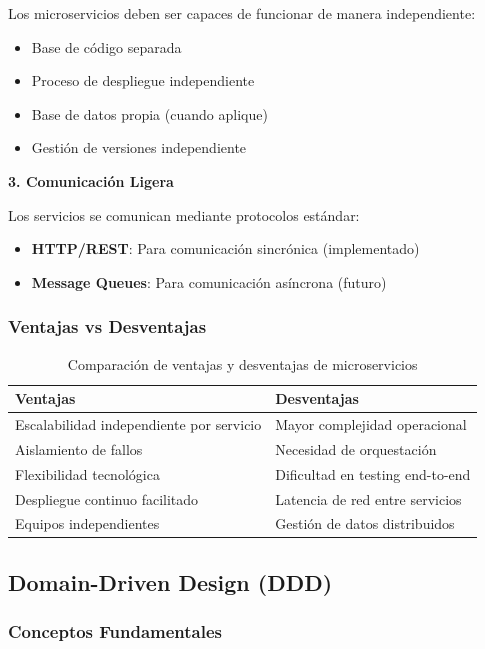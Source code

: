 \documentclass[12pt,a4paper]{article}
\begin{document}
Los microservicios deben ser capaces de funcionar de manera independiente:
\begin{itemize}
    \item Base de código separada
    \item Proceso de despliegue independiente
    \item Base de datos propia (cuando aplique)
    \item Gestión de versiones independiente
\end{itemize}

\textbf{3. Comunicación Ligera}

Los servicios se comunican mediante protocolos estándar:
\begin{itemize}
    \item \textbf{HTTP/REST}: Para comunicación sincrónica (implementado)
    \item \textbf{Message Queues}: Para comunicación asíncrona (futuro)
\end{itemize}

\subsubsection{Ventajas vs Desventajas}

\begin{table}[H]
\centering
\begin{tabular}{|p{7cm}|p{7cm}|}
\hline
\textbf{Ventajas} & \textbf{Desventajas} \\
\hline
Escalabilidad independiente por servicio & Mayor complejidad operacional \\
\hline
Aislamiento de fallos & Necesidad de orquestación \\
\hline
Flexibilidad tecnológica & Dificultad en testing end-to-end \\
\hline
Despliegue continuo facilitado & Latencia de red entre servicios \\
\hline
Equipos independientes & Gestión de datos distribuidos \\
\hline
\end{tabular}
\caption{Comparación de ventajas y desventajas de microservicios}
\end{table}

\subsection{Domain-Driven Design (DDD)}

\subsubsection{Conceptos Fundamentales}
\end{document}
